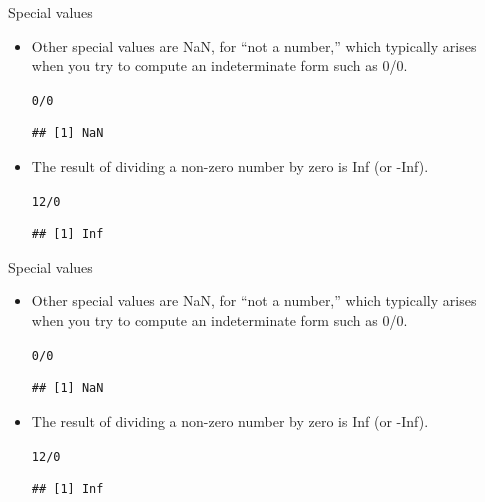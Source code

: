 \documentclass{beamer}\usepackage[]{graphicx}\usepackage[]{color}
\makeatletter
\newcommand{\hlnum}[1]{\textcolor[rgb]{0.686,0.059,0.569}{#1}}%
\newcommand{\hlopt}[1]{\textcolor[rgb]{0,0,0}{#1}}%
\newenvironment{kframe}{%
 \def\at@end@of@kframe{}%
 \ifinner\ifhmode%
  \def\at@end@of@kframe{\end{minipage}}%
  \begin{minipage}{\columnwidth}%
 \fi\fi%
 \def\FrameCommand##1{\hskip\@totalleftmargin \hskip-\fboxsep
 \colorbox{shadecolor}{##1}\hskip-\fboxsep
     \hskip-\linewidth \hskip-\@totalleftmargin \hskip\columnwidth}%
 \MakeFramed {\advance\hsize-\width
   \@totalleftmargin\z@ \linewidth\hsize
   \@setminipage}}%
 {\par\unskip\endMakeFramed%
 \at@end@of@kframe}
\newenvironment{knitrout}{}{} %
\renewenvironment{knitrout}{\begin{singlespace}}{\end{singlespace}}
\theoremstyle{mystyle}
\makeatother
\begin{document}
\begin{frame}[fragile]{Special values}
\begin{itemize}
\item Other special values are NaN, for “not a number,” which typically arises when you try to compute an indeterminate form such as 0/0.
\begin{knitrout}
\color{fgcolor}\begin{kframe}
\begin{alltt}
\hlnum{0}\hlopt{/}\hlnum{0}
\end{alltt}
\begin{verbatim}
## [1] NaN
\end{verbatim}
\end{kframe}
\end{knitrout}
\item The result of dividing a non-zero number by zero is Inf (or -Inf).
\begin{knitrout}
\color{fgcolor}\begin{kframe}
\begin{alltt}
\hlnum{12}\hlopt{/}\hlnum{0}
\end{alltt}
\begin{verbatim}
## [1] Inf
\end{verbatim}
\end{kframe}
\end{knitrout}
\end{itemize}
\end{frame}

\begin{frame}[fragile]{Special values}
\begin{itemize}
\item Other special values are NaN, for “not a number,” which typically arises when you try to compute an indeterminate form such as 0/0.
\begin{knitrout}
\color{fgcolor}\begin{kframe}
\begin{alltt}
\hlnum{0}\hlopt{/}\hlnum{0}
\end{alltt}
\begin{verbatim}
## [1] NaN
\end{verbatim}
\end{kframe}
\end{knitrout}
\item The result of dividing a non-zero number by zero is Inf (or -Inf).
\begin{knitrout}
\color{fgcolor}\begin{kframe}
\begin{alltt}
\hlnum{12}\hlopt{/}\hlnum{0}
\end{alltt}
\begin{verbatim}
## [1] Inf
\end{verbatim}
\end{kframe}
\end{knitrout}
\end{itemize}
\end{frame}
\end{document}
